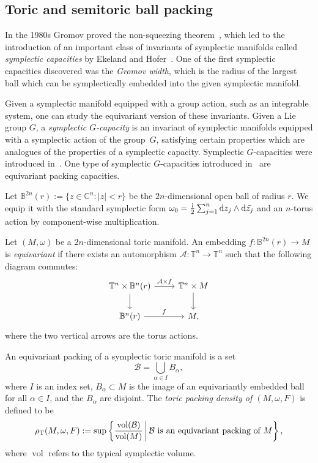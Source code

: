 \documentclass[10pt,a4paper]{amsart}
\numberwithin{equation}{section}
\def\C{{\mathbb C}}
\newcommand{\om}{\omega}
\theoremstyle{definition}
\theoremstyle{plain}
\theoremstyle{plain}
\begin{document}
\subsection{Toric and semitoric ball packing}

In the 1980s Gromov proved the non-squeezing theorem~\cite{Gromov1985}, which led to the introduction of an important class of invariants of symplectic manifolds called \emph{symplectic capacities} by Ekeland and Hofer~\cite{EkHo1989, Hocap1990}.
One of the first symplectic capacities discovered was the \emph{Gromov width}, which is the radius of the largest ball which can be symplectically embedded into the given symplectic manifold.

Given a symplectic manifold equipped with a group action, such as an integrable system, one can study the equivariant version of these invariants.
Given a Lie group $G$, a \emph{symplectic $G$-capacity} is an invariant of symplectic manifolds equipped with a symplectic action of the group~$G$, satisfying certain properties which are analogues of the properties of a symplectic capacity.
Symplectic $G$-capacities were introduced in~\cite{FiPaPe2016}.
One type of symplectic $G$-capacities introduced in~\cite{FiPaPe2016} are equivariant packing capacities.

Let $\mathbb{B}^{2n}(r) :=\{z \in \C^n\colon |z| < r\}$ be the $2n$-dimensional open ball of radius $r$. We equip it with the standard symplectic form $\om_0 = \frac{\mathrm{i}}{2} \sum_{j=1}^n {\rm d}z_j \wedge {\rm d}\bar{z_j}$ and an $n$-torus action by component-wise multiplication.

\begin{Definition} \label{def:equivariantembed}
Let $(M,\om)$ be a $2n$-dimensional toric manifold. An embedding $f\colon \mathbb{B}^{2n}(r) \to M $ is \emph{equivariant} if there exists an automorphism $\mathcal{A}\colon \mathbb{T}^n \to \mathbb{T}^n$ such that the following diagram commutes:
\[
\begin{tikzcd}
\mathbb{T}^n \times \mathbb{B}^n(r) \arrow[r, "\mathcal{A} \times f"] \arrow[d]
& \mathbb{T}^n \times M \arrow[d ] \\
\mathbb{B}^n(r) \arrow[r, "f" ]
& M,
\end{tikzcd}
\]
where the two vertical arrows are the torus actions.
\end{Definition}



An equivariant packing of a symplectic toric manifold is a set
\[
 \mathcal{B} = \bigcup_{\alpha\in I} B_\alpha,
\]
where $I$ is an index set, $B_\alpha\subset M$ is the image of an equivariantly embedded ball for all $\alpha\in I$, and the $B_\alpha$ are disjoint.
The \emph{toric packing density of $(M,\om,F)$} is defined to be
\begin{equation}\label{eqn:maximal-toric-packing}
 \rho_{{\rm T}}(M,\om,F) := \mathrm{sup} \left\{\frac{\text{vol}(\mathcal{B})}{\text{vol}(M)} \,  \bigg| \,  \mathcal{B} \text{ is an equivariant packing of $M$}\right\},
\end{equation}
where $\operatorname{vol}$ refers to the typical symplectic volume.
\end{document}
